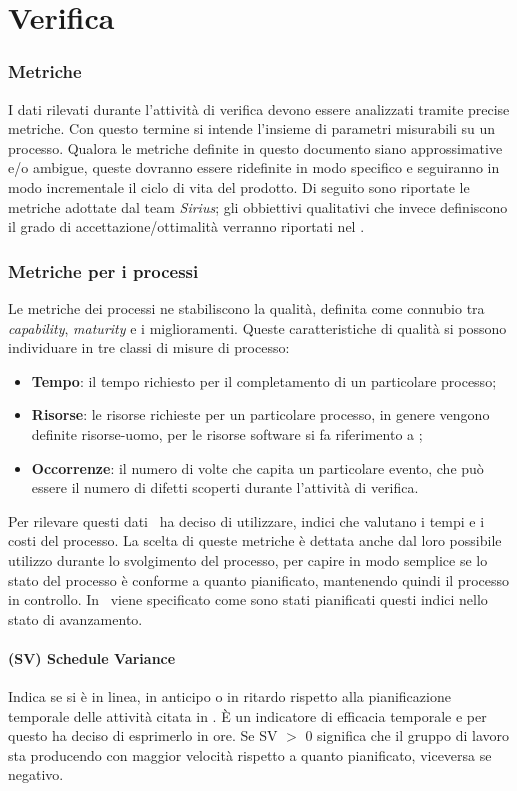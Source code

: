 \section{Verifica}
\subsubsection{Metriche}
I dati rilevati durante l'attività di verifica devono essere analizzati tramite precise metriche.
Con questo termine si intende l'insieme di parametri misurabili su un processo. Qualora le metriche definite in questo documento siano approssimative e/o ambigue, queste dovranno essere ridefinite in modo specifico e seguiranno in modo incrementale il ciclo di vita del prodotto. Di seguito sono riportate le metriche adottate dal team \textit{Sirius}; gli obbiettivi qualitativi che invece definiscono il grado di accettazione/ottimalità verranno riportati nel \PianoDiQualifica.
\subsubsection{Metriche per i processi}
Le metriche dei processi ne stabiliscono la qualità, definita come connubio tra \textit{capability}, \textit{maturity} e i miglioramenti. Queste caratteristiche di qualità si possono individuare in tre classi di misure di processo:
\begin{itemize}
\item \textbf{Tempo}: il tempo richiesto per il completamento di un particolare processo;
\item \textbf{Risorse}: le risorse richieste per un particolare processo, in genere vengono definite risorse-uomo, per le risorse software si fa riferimento a \infoNDP;
\item \textbf{Occorrenze}: il numero di volte che capita un particolare evento, che può essere il numero di difetti scoperti durante l'attività di verifica.
\end{itemize}
Per rilevare questi dati \gruppo ~ha deciso di utilizzare, indici che valutano i tempi e i costi del processo. La scelta di queste metriche è dettata anche dal loro possibile utilizzo durante lo svolgimento del processo, per capire in modo semplice se lo stato del processo è conforme a quanto pianificato, mantenendo quindi il processo in controllo. In \infoPDP ~viene specificato come sono stati pianificati questi indici nello stato di avanzamento.
\paragraph{(SV) Schedule Variance}
Indica se si è in linea, in anticipo o in ritardo rispetto alla pianificazione temporale delle attività citata in \infoPDP.
È un indicatore di efficacia temporale e per questo \gruppo ha deciso di esprimerlo in ore.
Se SV $>$ 0 significa che il gruppo di lavoro sta producendo con maggior velocità rispetto a quanto pianificato, viceversa se negativo.\\

